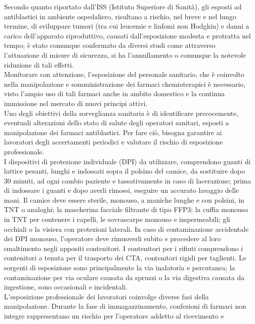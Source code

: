 Secondo quanto riportato dall’ISS (Istituto Superiore di Sanità), gli esposti ad antiblastici in ambiente 
ospedaliero, risultano a rischio, nel breve e nel lungo termine, di sviluppare tumori (tra cui leucemie e 
linfomi non Hodgkin) e danni a carico dell’apparato riproduttivo, causati dall’esposizione modesta e protratta nel 
tempo; è stato comunque confermato da diversi studi come attraverso l’attuazione di misure di sicurezza, 
si ha l’annullamento o comunque la notevole riduzione di tali effetti\cite{ISSESPO}.\\
Monitorare con attenzione, l’esposizione del personale sanitario, che è coinvolto nella manipolazione e 
somministrazione dei farmaci chemioterapici è necessario, visto l’ampio uso di tali farmaci 
anche in ambito domestico e la continua immissione nel mercato di nuovi principi attivi.\\
Uno degli obiettivi della sorveglianza sanitaria è di identificare precocemente, eventuali alterazioni dello stato 
di salute degli operatori sanitari, esposti a manipolazione dei farmaci antiblastici. Per fare ciò, 
bisogna garantire ai lavoratori degli accertamenti periodici e valutare il rischio di esposizione professionale\cite{ISSESPO}.\\
I dispositivi di protezione individuale (DPI) da utilizzare, comprendono guanti di lattice pesanti, lunghi e indossati 
sopra il polsino del camice, da sostituire dopo 30 minuti, ad ogni cambio paziente e tassativamente in caso di 
lacerazione; prima di indossare i guanti e dopo averli rimossi, eseguire un accurato lavaggio delle mani. 
Il camice deve essere sterile, monouso, a maniche lunghe e con polsini, in TNT o analoghi; la mascherina facciale 
filtrante di tipo FFP3; la cuffia monouso in TNT per contenere i capelli, le sovrascarpe monouso e impermeabili; 
gli occhiali o la visiera con protezioni laterali. In caso di contaminazione accidentale dei DPI monouso,
l’operatore deve rimuoverli subito e procedere al loro smaltimento negli appositi contenitori. %
I contenitori per i rifiuti comprendono i contenitori a tenuta per il trasporto dei CTA, 
contenitori rigidi per taglienti. %
Le sorgenti di esposizione sono principalmente la via inalatoria e percutanea; la contaminazione per via oculare 
causata da spruzzi o la via digestiva causata da ingestione, sono occasionali e incidentali\cite{FNOPI}.\\ 
L’esposizione professionale dei lavoratori coinvolge diverse fasi della manipolazione. Durante la fase di 
immagazzinamento, confezioni di farmaci non integre rappresentano un rischio per l’operatore addetto al ricevimento e 
